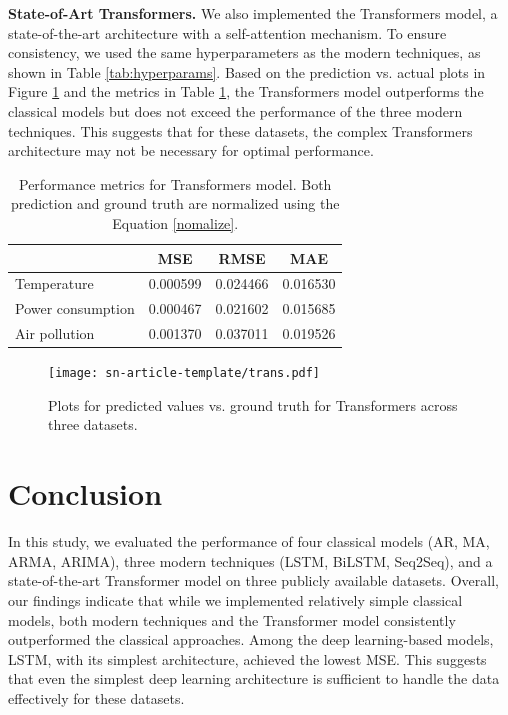 \documentclass[sn-mathphys-num]{sn-jnl}
\theoremstyle{thmstyleone}%
\theoremstyle{thmstyletwo}%
\theoremstyle{thmstylethree}%
\begin{document}
\textbf{State-of-Art Transformers.} We also implemented the Transformers model, a state-of-the-art architecture with a self-attention mechanism. To ensure consistency, we used the same hyperparameters as the modern techniques, as shown in Table \ref{tab:hyperparams}. Based on the prediction vs. actual plots in Figure \ref{fig:trans} and the metrics in Table \ref{tab:trans_metric}, the Transformers model outperforms the classical models but does not exceed the performance of the three modern techniques. This suggests that for these datasets, the complex Transformers architecture may not be necessary for optimal performance.
\begin{table}[h]
\centering
\begin{tabular}{@{}lccc@{}}
\toprule
\textbf{}               & \hspace{0.6cm} \textbf{MSE} & \textbf{RMSE} & \textbf{MAE} \\ \midrule
Temperature           & \hspace{0.6cm} 0.000599     & \hspace{1cm} 0.024466     \hspace{1cm} & 0.016530     \\
Power consumption       & \hspace{0.6cm} 0.000467     & 0.021602      & 0.015685     \\
Air pollution           & \hspace{0.6cm} 0.001370     & 0.037011      & 0.019526     \\ \bottomrule
\end{tabular}
\caption{Performance metrics for Transformers model. Both prediction and ground truth are normalized using the Equation \ref{nomalize}.}
\label{tab:trans_metric}
\end{table}
\begin{figure}[H]
	\begin{center}
		\texttt{[image: sn-article-template/trans.pdf]}
	\end{center}
	\caption{Plots for predicted values vs. ground truth for Transformers across three datasets.}
	\label{fig:trans}
\end{figure}

\section{Conclusion}
In this study, we evaluated the performance of four classical models (AR, MA, ARMA, ARIMA), three modern techniques (LSTM, BiLSTM, Seq2Seq), and a state-of-the-art Transformer model on three publicly available datasets. Overall, our findings indicate that while we implemented relatively simple classical models, both modern techniques and the Transformer model consistently outperformed the classical approaches. Among the deep learning-based models, LSTM, with its simplest architecture, achieved the lowest MSE. This suggests that even the simplest deep learning architecture is sufficient to handle the data effectively for these datasets.
\end{document}
